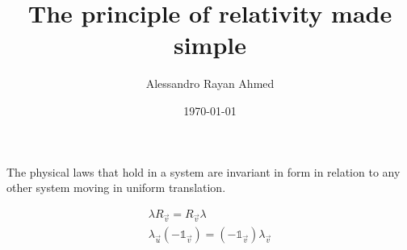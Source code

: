 

\usepackage[english]{babel}

\title{The principle of relativity made simple}
\author{Alessandro Rayan Ahmed}
\date{\today}



\begin{multicols}{3}
  \maketitle
  The physical laws that hold in a system are invariant in form
  in relation to any other system moving in uniform translation.

  \begin{equation}
    \label{eq:v-isotropy}
    \begin{gathered}
      \lambda R_{\vec{v}} = R_{\vec{v}}\lambda \\
      \lambda_{\vec{u}}(-\mathds{1}_{\vec{v}}) = (-\mathds{1}_{\vec{v}})\lambda_{\vec{v}} \\
    \end{gathered}
  \end{equation}


\end{multicols}
